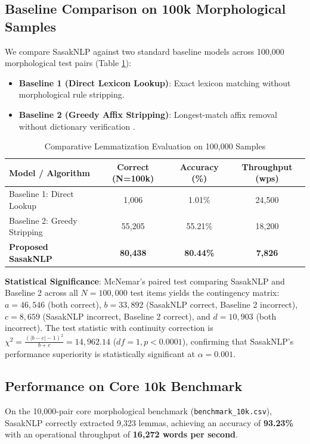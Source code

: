 \documentclass[journal,10pt]{IEEEtran}
\begin{document}
\subsection{Baseline Comparison on 100k Morphological Samples}
We compare SasakNLP against two standard baseline models across 100,000 morphological test pairs (Table \ref{tab:baseline_eval}):
\begin{itemize}
    \item \textbf{Baseline 1 (Direct Lexicon Lookup)}: Exact lexicon matching without morphological rule stripping.
    \item \textbf{Baseline 2 (Greedy Affix Stripping)}: Longest-match affix removal without dictionary verification \cite{abidin2024}.
\end{itemize}

\begin{table}[htbp]
\caption{Comparative Lemmatization Evaluation on 100,000 Samples}
\label{tab:baseline_eval}
\centering
\begin{tabular}{|l|c|c|c|}
\hline
\textbf{Model / Algorithm} & \textbf{Correct (N=100k)} & \textbf{Accuracy (\%)} & \textbf{Throughput (wps)} \\ \hline
Baseline 1: Direct Lookup     & 1,006  & 1.01\%  & 24,500 \\ \hline
Baseline 2: Greedy Stripping  & 55,205 & 55.21\% & 18,200 \\ \hline
\textbf{Proposed SasakNLP}    & \textbf{80,438} & \textbf{80.44\%} & \textbf{7,826} \\ \hline
\end{tabular}
\end{table}

\textbf{Statistical Significance}: McNemar's paired test comparing SasakNLP and Baseline 2 across all $N = 100,000$ test items yields the contingency matrix: $a = 46,546$ (both correct), $b = 33,892$ (SasakNLP correct, Baseline 2 incorrect), $c = 8,659$ (SasakNLP incorrect, Baseline 2 correct), and $d = 10,903$ (both incorrect). The test statistic with continuity correction is $\chi^2 = \frac{(|b - c| - 1)^2}{b + c} = 14,962.14$ ($df = 1, p < 0.0001$), confirming that SasakNLP's performance superiority is statistically significant at $\alpha = 0.001$.

\subsection{Performance on Core 10k Benchmark}
On the 10,000-pair core morphological benchmark (\texttt{benchmark\_10k.csv}), SasakNLP correctly extracted 9,323 lemmas, achieving an accuracy of \textbf{93.23\%} with an operational throughput of \textbf{16,272 words per second}.
\end{document}

